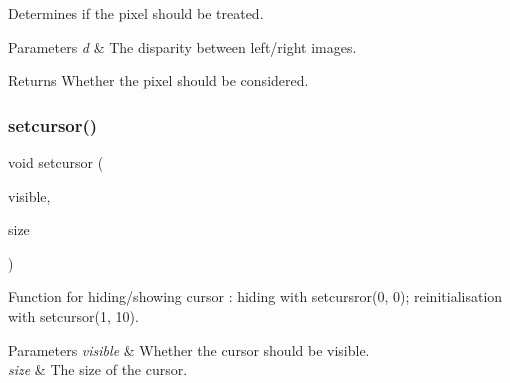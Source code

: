 Determines if the pixel should be treated. 


\begin{DoxyParams}{Parameters}
{\em d} & The disparity between left/right images. \\
\hline
\end{DoxyParams}
\begin{DoxyReturn}{Returns}
Whether the pixel should be considered. 
\end{DoxyReturn}
\mbox{\label{project_data_8cpp_ac1fcd50fb6cdd3f89bc66a56c9845637}} 
\subsubsection{setcursor()}
{\footnotesize\ttfamily void setcursor (\begin{DoxyParamCaption}\item[{bool}]{visible,  }\item[{D\+W\+O\+RD}]{size }\end{DoxyParamCaption})}



Function for hiding/showing cursor \+: hiding with setcursror(0, 0); reinitialisation with setcursor(1, 10). 


\begin{DoxyParams}{Parameters}
{\em visible} & Whether the cursor should be visible. \\
\hline
{\em size} & The size of the cursor. \\
\hline
\end{DoxyParams}
